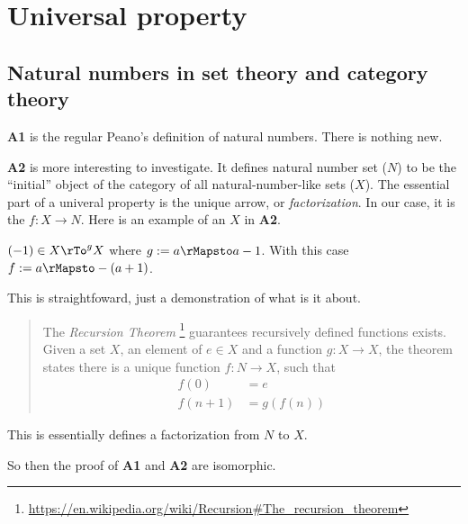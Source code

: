 \section{Universal property}

\subsection{Natural numbers in set theory and category theory}

\textbf{A1} is the regular Peano's definition of natural numbers. There is
nothing new.

\textbf{A2} is more interesting to investigate. It defines natural
number set ($N$) to be the ``initial'' object of the category of all
natural-number-like sets ($X$). The essential part of a univeral
property is the unique arrow, or
\emph{factorization}. In our case, it is the $f : X \to N$. Here is an
example of an $X$ in \textbf{A2}.

\begin{example}
  $(-1) \in X \rTo^g X$ where
  $g := a \rMapsto a-1$. With this case
  $f := a \rMapsto -(a+1)$.
\end{example}

This is straightfoward, just a demonstration of what is it about.


\begin{quotation}
  The \emph{Recursion Theorem}
  \footnote{\url{https://en.wikipedia.org/wiki/Recursion#The_recursion_theorem}}
  guarantees recursively defined functions exists. Given a set $X$, an
  element of $e\in X$ and a function $g : X \to X$, the theorem states
  there is a unique function $f : N \to X$, such that
  \begin{align}
    f(0) &= e \\
    f(n+1) &= g(f(n))
  \end{align}
\end{quotation}

This is essentially defines a factorization from $N$ to $X$.

So then the proof of \textbf{A1} and \textbf{A2} are isomorphic.


